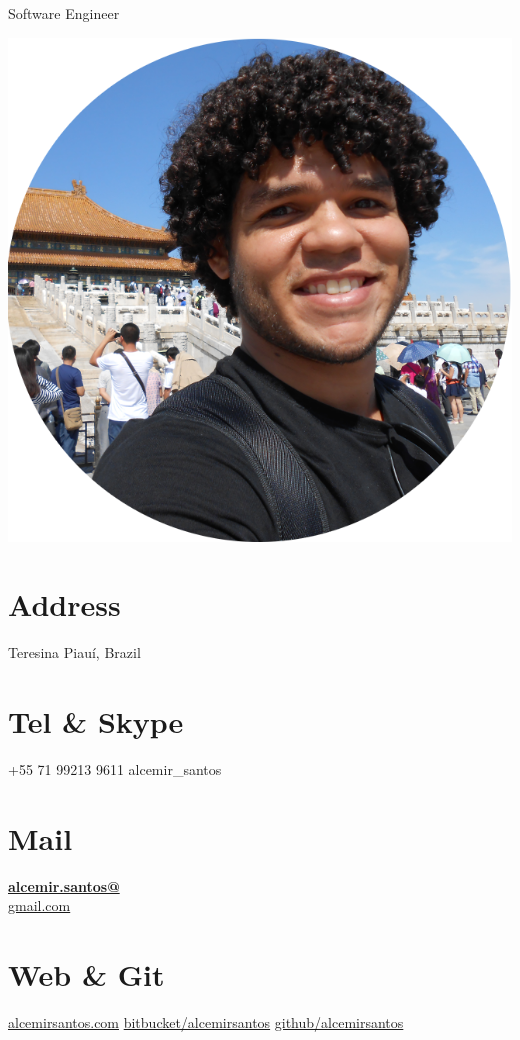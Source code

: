 \documentclass[]{friggeri-cv}
\begin{document}
  \vspace{1cm}
      {Software Engineer}
      

\begin{aside}
  \includegraphics[scale=0.18]{img/eu-circle.png}
  \section{Address}
    Teresina
    Piauí, Brazil
    ~
  \section{Tel \& Skype}
    +55 71  99213 9611
    alcemir\_santos
    ~
  \section{Mail}
    \href{mailto:alcemir.santos@gmail.com}{\textbf{alcemir.santos@}\\gmail.com}
    ~
  \section{Web \& Git}
    \href{http://alcemirsantos.com}{alcemirsantos.com}
    \href{https://bitbucket.org/alcemirsantos}{bitbucket/alcemirsantos}
        \href{https://github.com/alcemirsantos}{github/alcemirsantos}
    ~

\end{aside}
\end{document}
